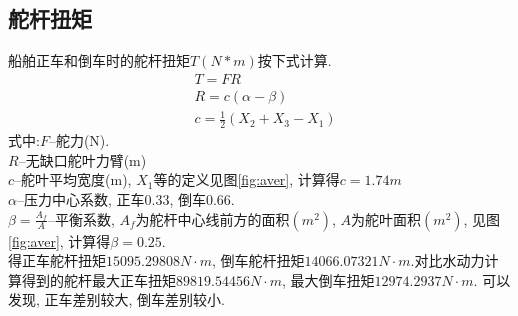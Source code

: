 \documentclass[a4paper,UTF8]{article}
\begin{document}
\subsection{舵杆扭矩}
船舶正车和倒车时的舵杆扭矩$T(N*m)$按下式计算.
\begin{equation}\label{equ:tfr}
\begin{split}
&T=FR\\
&	R=c(\alpha-\beta)\\
&c=\frac{1}{2}(X_{2}+X_{3}-X_{1})
\end{split}
\end{equation}
式中:$F$--舵力(N).\\$R$--无缺口舵叶力臂(m)\\$c$--舵叶平均宽度(m), $X_{1}$等的定义见图\ref{fig:aver}, 计算得$c=1.74m$\\
$\alpha$--压力中心系数, 正车0.33, 倒车0.66.\\
$\beta=\frac{A_{f}}{A}$--平衡系数, $A_{f}$为舵杆中心线前方的面积$(m^2)$, $A$为舵叶面积$(m^2)$, 见图\ref{fig:aver}, 计算得$\beta=0.25$.\\
得正车舵杆扭矩$15095.29808N\cdot m$, 倒车舵杆扭矩$14066.07321N\cdot m$.对比水动力计算得到的舵杆最大正车扭矩$89819.54456N\cdot m$, 最大倒车扭矩$12974.2937N\cdot m$. 可以发现, 正车差别较大, 倒车差别较小.
\end{document}
